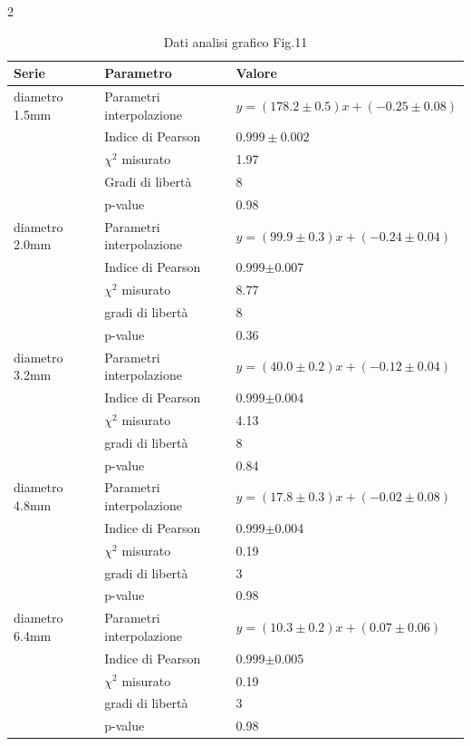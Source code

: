 \documentclass{article}
\begin{document}
\begin{multicols}{2}
\begin{table}[H]
\centering
\small
\begin{tabular}{|p{2cm}|p{3cm}|p{2cm}|}
\hline
\textbf{Serie} & \textbf{Parametro} & \textbf{Valore} \\ \hline
diametro 1.5mm & Parametri interpolazione & $y=(178.2\pm 0.5)x + (-0.25\pm 0.08) $ \\ \hline
 & Indice di Pearson & $0.999 \pm 0.002$ \\ \hline
 & $\chi^2$ misurato & 1.97 \\ \hline 
 & Gradi di libertà & 8 \\ \hline
 & p-value & 0.98 \\ \hline
diametro 2.0mm & Parametri interpolazione & $y=(99.9\pm 0.3)x + (-0.24\pm 0.04) $ \\ \hline
& Indice di Pearson & 0.999$\pm$0.007 \\ \hline
&$\chi^2$ misurato &  8.77\\ \hline 
&gradi di libertà&  8\\ \hline
&p-value&  0.36\\ \hline
diametro 3.2mm & Parametri interpolazione & $y=(40.0\pm 0.2)x + (-0.12\pm 0.04) $ \\ \hline 
& Indice di Pearson & 0.999$\pm$0.004 \\ \hline
&$\chi^2$ misurato &  4.13\\ \hline 
&gradi di libertà&  8\\ \hline
&p-value&  0.84\\ \hline
diametro 4.8mm & Parametri interpolazione & $y=(17.8\pm 0.3)x + (-0.02\pm 0.08) $ \\ \hline 
& Indice di Pearson & 0.999$\pm$0.004 \\ \hline
&$\chi^2$ misurato &  0.19\\ \hline 
&gradi di libertà&  3\\ \hline
&p-value&  0.98\\ \hline
diametro 6.4mm & Parametri interpolazione & $y=(10.3\pm 0.2)x + (0.07\pm 0.06) $ \\ \hline
& Indice di Pearson & 0.999$\pm$0.005 \\ \hline
&$\chi^2$ misurato &  0.19\\ \hline 
&gradi di libertà&  3\\ \hline
&p-value&  0.98\\ \hline
\end{tabular}
\caption{Dati analisi grafico Fig.11 }
\end{table}



\end{multicols}
\end{document}
